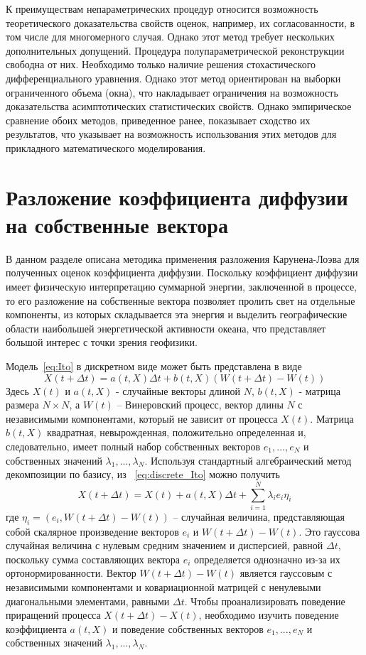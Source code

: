 К преимуществам непараметрических процедур относится возможность теоретического доказательства свойств оценок, например, их согласованности, в том числе для многомерного случая. Однако этот метод требует нескольких дополнительных допущений. Процедура полупараметрической реконструкции свободна от них. Необходимо только наличие решения стохастического дифференциального уравнения. Однако этот метод ориентирован на выборки ограниченного объема (окна), что накладывает ограничения на возможность доказательства асимптотических статистических свойств. Однако эмпирическое сравнение обоих методов, приведенное ранее, показывает сходство их результатов, что указывает на возможность использования этих методов для прикладного математического моделирования.

\section{Разложение коэффициента диффузии на собственные вектора}
\label{sec:Karhunen}

В данном разделе описана методика применения разложения Карунена-Лоэва для полученных оценок коэффициента диффузии. Поскольку коэффициент диффузии имеет физическую интерпретацию суммарной энергии, заключенной в процессе, то его разложение на собственные вектора позволяет пролить свет на отдельные компоненты, из которых складывается эта энергия и выделить географические области наибольшей энергетической активности океана, что представляет большой интерес с точки зрения геофизики.

Модель~\eqref{eq:Ito} в дискретном виде может быть представлена в виде
\begin{equation}
	\label{eq:discrete_Ito}
	X(t+\Delta t) = a(t,X) \Delta t + b(t,X) (W (t+\Delta t)-W(t))	
\end{equation}
Здесь $X(t)$ и $a(t,X)$ - случайные векторы длиной $N$, $b(t,X)$ - матрица размера $N\times N$, а $W(t)$ -- Винеровский процесс, вектор длины $N$ с независимыми компонентами, который не зависит от процесса $X(t)$. Матрица $b(t,X)$ квадратная, невырожденная, положительно определенная и, следовательно, имеет полный набор собственных векторов $e_1,...,e_N$ и собственных значений $\lambda_1,...,\lambda_N$. Используя стандартный алгебраический метод декомпозиции по базису, из ~\eqref{eq:discrete_Ito} можно получить
\begin{equation}
	\label{eq:decomposition}
	X(t+\Delta t) = X(t) + a(t,X) \Delta t + \sum_{i=1}^N \lambda_i e_i \eta_i
\end{equation}
где $\eta_i= (e_i,W(t+\Delta t)-W(t))$ -- случайная величина, представляющая собой скалярное произведение векторов $e_i$ и $W(t+\Delta t)-W(t)$. Это гауссова случайная величина с нулевым средним значением и дисперсией, равной $\Delta t$, поскольку сумма составляющих вектора $e_i$ определяется однозначно из-за их ортонормированности. Вектор $W (t + \Delta t)-W (t)$ является гауссовым с независимыми компонентами и ковариационной матрицей с ненулевыми диагональными элементами, равными $\Delta t$. Чтобы проанализировать поведение приращений процесса $X(t+\Delta t) - X(t)$, необходимо изучить поведение коэффициента $a(t,X)$ и поведение собственных векторов $e_1,...,e_N$ и собственных значений $\lambda_1,...,\lambda_N$.


